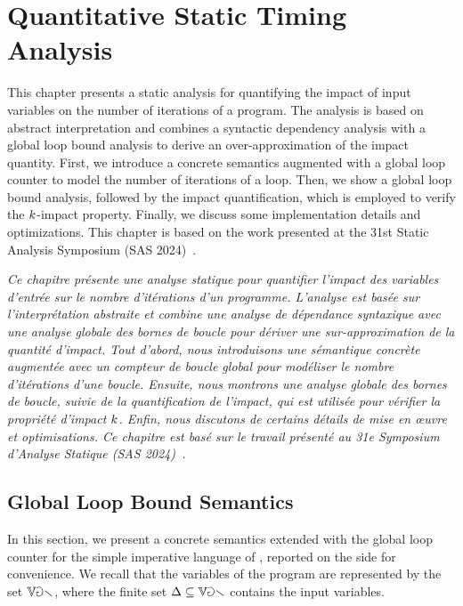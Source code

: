 \chapter{Quantitative Static Timing Analysis}

This chapter presents a static analysis for quantifying the impact of input variables on the number of iterations of a program.
The analysis is based on abstract interpretation and combines a syntactic dependency analysis with a global loop bound analysis to derive an over-approximation of the impact quantity.
First, we introduce a concrete semantics augmented with a global loop counter to model the number of iterations of a loop.
Then, we show a global loop bound analysis, followed by the impact quantification, which is employed to verify the $k$-impact property.
Finally, we discuss some implementation details and optimizations.
This chapter is based on the work presented at the 31st Static Analysis Symposium (SAS 2024)~\cite{Mazzucato2024sas}.

\emph{Ce chapitre présente une analyse statique pour quantifier l'impact des variables d'entrée sur le nombre d'itérations d'un programme. L'analyse est basée sur l'interprétation abstraite et combine une analyse de dépendance syntaxique avec une analyse globale des bornes de boucle pour dériver une sur-approximation de la quantité d'impact. Tout d'abord, nous introduisons une sémantique concrète augmentée avec un compteur de boucle global pour modéliser le nombre d'itérations d'une boucle. Ensuite, nous montrons une analyse globale des bornes de boucle, suivie de la quantification de l'impact, qui est utilisée pour vérifier la propriété d'impact $k$. Enfin, nous discutons de certains détails de mise en œuvre et optimisations. Ce chapitre est basé sur le travail présenté au 31e Symposium d'Analyse Statique (SAS 2024)~.}



\section{Global Loop Bound Semantics}


In this section, we present a concrete semantics extended with the global loop counter for the simple imperative language of , reported on the side for convenience.
We recall that the variables of the program are represented by the set $\mathbb{Var}$, where the finite set $\Delta\subseteq\mathbb{Var}$ contains the input variables.

